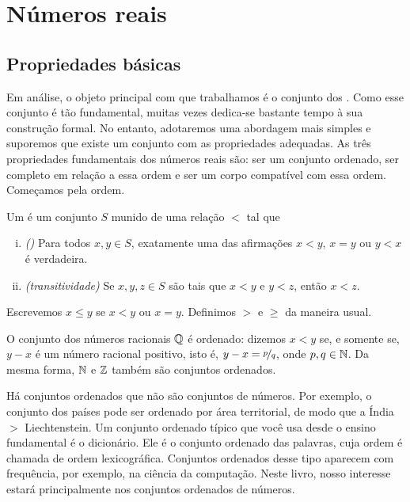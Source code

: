\chapter{Números reais} \label{rn:chapter}


\section{Propriedades básicas} \label{sec:basicpropsrn}


Em análise, o objeto principal com que trabalhamos é o conjunto dos
. Como esse conjunto é tão fundamental, muitas vezes
dedica-se bastante tempo à sua construção formal. No entanto, adotaremos uma
abordagem mais simples e suporemos que existe um conjunto com as propriedades
adequadas.
As três propriedades fundamentais dos números reais são: ser um conjunto
ordenado, ser completo em relação a essa ordem e ser um corpo compatível com
essa ordem.
Começamos pela ordem.

\begin{defn}
Um \emph{} é um conjunto $S$ munido de
uma relação $<$ tal que
\begin{enumerate}[(i)]
\item \emph{()} Para todos $x, y \in S$, exatamente uma
das afirmações $x < y$, $x=y$ ou $y < x$ é verdadeira.
\item \emph{(transitividade)} Se $x,y,z \in S$ são tais que $x < y$ e $y
< z$, então $x < z$.
\end{enumerate}
Escrevemos $x \leq y$ se $x < y$ ou $x=y$. Definimos
$>$ e $\geq$ da maneira usual.
\end{defn}


O conjunto dos números racionais ${\mathbb{Q}}$ é ordenado: dizemos
$x < y$ se, e somente se, $y-x$ é um número racional positivo, isto é,
$y-x = \nicefrac{p}{q}$, onde $p,q \in {\mathbb{N}}$. Da mesma forma,
${\mathbb{N}}$ e ${\mathbb{Z}}$ também são conjuntos ordenados.

Há conjuntos ordenados que não são conjuntos de números. Por exemplo, o
conjunto dos países pode ser ordenado por área territorial, de modo que a Índia $>$ Liechtenstein.
Um conjunto ordenado típico que você usa desde o ensino fundamental é o
dicionário. Ele é o conjunto ordenado das palavras, cuja ordem é chamada de
ordem lexicográfica. Conjuntos ordenados desse tipo aparecem com frequência,
por exemplo, na ciência da computação. Neste livro, nosso interesse estará
principalmente nos conjuntos ordenados de números.

